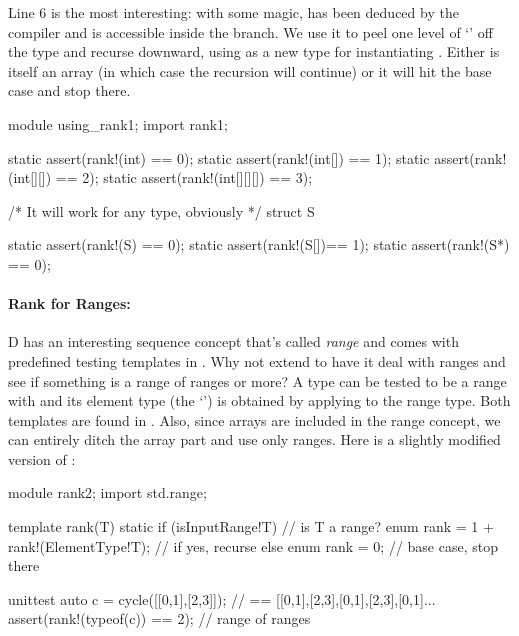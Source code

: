 Line 6 is the most interesting: with some  magic,  has been deduced by the compiler and is accessible inside the  branch. We use it to peel one level of `\DD{[]}' off the type and recurse downward, using  as a new type for instantiating . Either  is itself an array (in which case the recursion will continue) or it will hit the base case and stop there.

\begin{dcode}
module using_rank1;
import rank1;

static assert(rank!(int)       == 0);
static assert(rank!(int[])     == 1);
static assert(rank!(int[][])   == 2);
static assert(rank!(int[][][]) == 3);

/* It will work for any type, obviously */
struct S {}

static assert(rank!(S)  == 0);
static assert(rank!(S[])== 1);
static assert(rank!(S*) == 0);
\end{dcode}


\paragraph{Rank for Ranges:}\label{rankforranges}

D has an interesting sequence concept that's called \emph{range} and comes with predefined testing templates in . Why not extend  to have it deal with ranges and see if something is a range of ranges or more? A type can be tested to be a range with  and its element type (the `') is obtained by applying  to the range type. Both templates are found in . Also, since arrays are included in the range concept, we can entirely ditch the array part and use only ranges. Here is a slightly modified version of :

\begin{dcode}
module rank2;
import std.range;

template rank(T)
{
    static if (isInputRange!T)                // is T a range?
        enum rank = 1 + rank!(ElementType!T); // if yes, recurse
    else                                      
        enum rank = 0;                        // base case, stop there
}

unittest
{
    auto c = cycle([[0,1],[2,3]]); // == [[0,1],[2,3],[0,1],[2,3],[0,1]...
    assert(rank!(typeof(c)) == 2); // range of ranges
}
\end{dcode}

